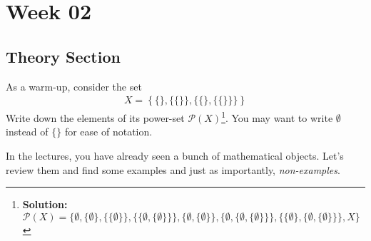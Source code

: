 \section{Week 02}

\subsection{Theory Section}
As a warm-up, consider the set
\begin{align*}
  X  = \left\{
    \{\}, \{\{\}\}, \{\{\},\{\{\}\}\}
  \right\}
\end{align*}
Write down the elements of its power-set $\mathcal{P}(X)$\footnote{\textbf{Solution:} $\mathcal{P}(X) = \big\{\emptyset,\{\emptyset\},\{\{\emptyset\}\},\{\{\emptyset,\{\emptyset\}\}\}, \{\emptyset,\{\emptyset\}\}, \{\emptyset,\{\emptyset,\{\emptyset\}\}\},\{\{\emptyset\},\{\emptyset,\{\emptyset\}\}\},X\big\}$}. You may want to write $\emptyset$ instead of $\{\}$ for ease of notation.

In the lectures, you have already seen a bunch of mathematical objects. Let's review them and find some examples and just as importantly, \emph{non-examples}.

